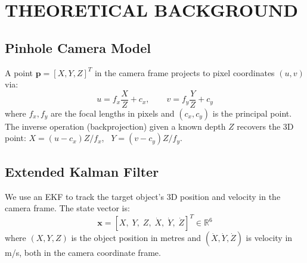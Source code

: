 \documentclass[letterpaper, 10 pt, conference]{ieeeconf}  %
\begin{document}
\section{THEORETICAL BACKGROUND}

\subsection{Pinhole Camera Model}
A point $\mathbf{p} = [X, Y, Z]^T$ in the camera frame projects to pixel coordinates $(u, v)$ via:
\begin{equation}
u = f_x \frac{X}{Z} + c_x, \qquad v = f_y \frac{Y}{Z} + c_y
\label{eq:projection}
\end{equation}
where $f_x, f_y$ are the focal lengths in pixels and $(c_x, c_y)$ is the principal point. The inverse operation (backprojection) given a known depth $Z$ recovers the 3D point: $X = (u - c_x) Z / f_x$, \ $Y = (v - c_y) Z / f_y$.

\subsection{Extended Kalman Filter}
We use an EKF to track the target object's 3D position and velocity in the camera frame. The state vector is:
\begin{equation}
\mathbf{x} = [X, \; Y, \; Z, \; \dot{X}, \; \dot{Y}, \; \dot{Z}]^T \in \mathbb{R}^6
\end{equation}
where $(X, Y, Z)$ is the object position in metres and $(\dot{X}, \dot{Y}, \dot{Z})$ is velocity in m/s, both in the camera coordinate frame.
\end{document}
